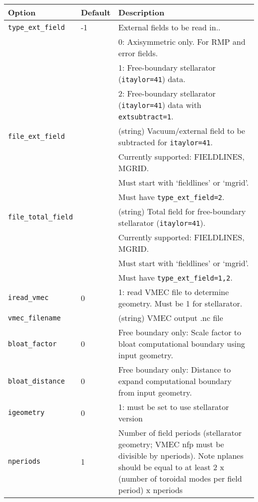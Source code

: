 \begin{tabular}{llp{4.5in}}
  \textbf{Option}&\textbf{Default}&\textbf{Description}\\
  \hline
 \texttt{type\_ext\_field}        & -1& External fields to be read in.. \\
				  &   &	0: Axisymmetric only. For RMP and error fields. \\
				  &   &	1: Free-boundary stellarator (\texttt{itaylor=41}) data. \\
				  &   &	2: Free-boundary stellarator (\texttt{itaylor=41}) data with \texttt{extsubtract=1}. \\
 \texttt{file\_ext\_field}        &   & (string) Vacuum/external field to be subtracted for \texttt{itaylor=41}.\\
				  &   & Currently supported: FIELDLINES, MGRID. \\
				  &   & Must start with `fieldlines' or `mgrid'. \\
                                  &   & Must have \texttt{type\_ext\_field=2}.\\
 \texttt{file\_total\_field}      &   & (string) Total field for free-boundary stellarator (\texttt{itaylor=41}).\\
				  &   & Currently supported: FIELDLINES, MGRID. \\
				  &   & Must start with `fieldlines' or `mgrid'. \\
                                  &   & Must have \texttt{type\_ext\_field=1,2}.\\
 \texttt{iread\_vmec}             & 0 & 1: read VMEC file to determine geometry. Must be 1 for stellarator. \\
 \texttt{vmec\_filename}          &   & (string) VMEC output .nc file \\
 \texttt{bloat\_factor}           & 0 & Free boundary only:  Scale factor to bloat computational boundary using input geometry. \\
 \texttt{bloat\_distance}         & 0 & Free boundary only:  Distance to expand computational boundary from input geometry. \\
 \texttt{igeometry}               & 0 & 1: must be set to use stellarator version \\
 \texttt{nperiods}                & 1 & Number of field periods (stellarator geometry; VMEC nfp must be divisible by nperiods).    Note nplanes
                                        should be equal to at least 2 x (number of toroidal modes 
                                        per field period) x nperiods \\

\end{tabular}
